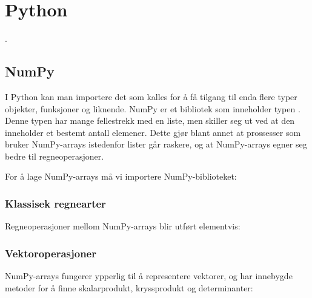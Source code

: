 





\section{Python}
.
\subsection{NumPy}
I Python kan man importere det som kalles  for å få tilgang til enda flere typer objekter, funksjoner og liknende. NumPy er et bibliotek som inneholder typen . Denne typen har mange fellestrekk med en liste, men skiller seg ut ved at den inneholder et bestemt antall elemener. Dette gjør blant annet at prossesser som bruker NumPy-arrays istedenfor lister går raskere, og at NumPy-arrays egner seg bedre til regneoperasjoner.\vsk

For å lage NumPy-arrays må vi importere NumPy-biblioteket: \regv
{}

\newpage
\subsubsection{Klassisek regnearter}
Regneoperasjoner mellom NumPy-arrays blir utført elementvis:
\subsubsection{Vektoroperasjoner}
NumPy-arrays fungerer ypperlig til å representere vektorer, og har innebygde metoder for å finne skalarprodukt, kryssprodukt og determinanter:\regv



